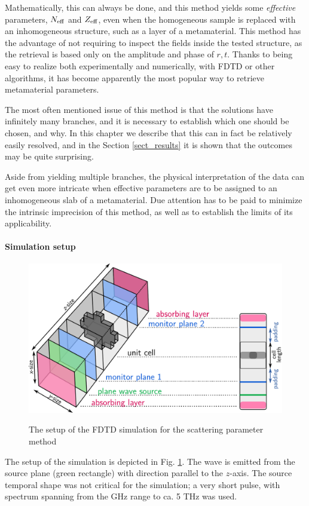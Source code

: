 Mathematically, this can always be done, and this method yields some \textit{effective} parameters, $N_{\text{eff} }$ and $Z_{\text{eff} }$, even when the homogeneous sample is replaced with an inhomogeneous structure, such as a layer of a metamaterial. This method has the advantage of not requiring to inspect the fields inside the tested structure, as the retrieval is based only on the amplitude and phase of $r,t$. Thanks to being easy to realize both experimentally and numerically, with FDTD or other algorithms, %
it has become apparently the most popular way to retrieve metamaterial parameters. 

The most often mentioned issue of this method is that the solutions have infinitely many branches, and it is necessary to establish which one should be chosen, and why. In this chapter we describe that this can in fact be relatively easily resolved, and in the Section \ref{sect_results} it is shown that the outcomes may be quite surprising.

Aside from yielding multiple branches, the physical interpretation of the data can get even more intricate when effective parameters are to be assigned to an inhomogeneous slab of a metamaterial. Due attention has to be paid to minimize the intrinsic imprecision of this method, as well as to establish the limits of its applicability. 
\paragraph{Simulation setup} %
\begin{figure}[h] \centering \caption{The setup of the FDTD simulation for the scattering parameter method} \includegraphics[width=12cm]{img/meep_geometry.pdf}  \label{fg_fdtd_sparam} \end{figure} 
The setup of the simulation is depicted in Fig. \ref{fg_fdtd_sparam}. The wave is emitted from the source plane (green rectangle) with direction parallel to the $z$-axis. The source temporal shape was not critical for the simulation; a very short pulse, with spectrum spanning from the GHz range to ca. 5 THz was used. 

